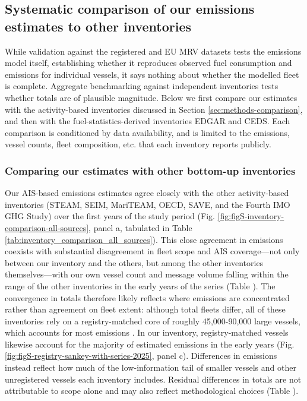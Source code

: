 \subsection{Systematic comparison of our emissions estimates to other inventories}\label{sec:inventory-comparison}

While validation against the registered and EU MRV datasets tests the emissions model itself, establishing whether it reproduces observed fuel consumption and emissions for individual vessels, it says nothing about whether the modelled fleet is complete. Aggregate benchmarking against independent inventories tests whether totals are of plausible magnitude. Below we first compare our estimates with the activity-based inventories discussed in Section \ref{sec:methods-comparison}, and then with the fuel-statistics-derived inventories EDGAR and CEDS. Each comparison is conditioned by data availability, and is limited to the emissions, vessel counts, fleet composition, etc. that each inventory reports publicly.

\subsubsection{Comparing our estimates with other bottom-up inventories}

Our AIS-based emissions estimates agree closely with the other activity-based inventories (STEAM, SEIM, MariTEAM, OECD, SAVE, and the Fourth IMO GHG Study) over the first years of the study period (Fig. \ref{fig:figS-inventory-comparison-all-sources}, panel a, tabulated in Table \ref{tab:inventory_comparison_all_sources}). This close agreement in emissions coexists with substantial disagreement in fleet scope and AIS coverage—not only between our inventory and the others, but among the other inventories themselves—with our own vessel count and message volume falling within the range of the other inventories in the early years of the series (Table ). The convergence in totals therefore likely reflects where emissions are concentrated rather than agreement on fleet extent: although total fleets differ, all of these inventories rely on a registry-matched core of roughly 45,000-90,000 large vessels, which accounts for most emissions \cite{fourth2020greenhouse, yiHighresolutionGlobalShipping2025, oecdMaritimeTransportCO2Methodology2025, documentationV2025031Documentation, johanssonGlobalAssessmentShipping2017, kramelGlobalShippingEmissions2021}. In our inventory, registry-matched vessels likewise account for the majority of estimated emissions in the early years (Fig. \ref{fig:figS-registry-sankey-with-series-2025}, panel c). Differences in emissions instead reflect how much of the low-information tail of smaller vessels and other unregistered vessels each inventory includes. Residual differences in totals are not attributable to scope alone and may also reflect methodological choices (Table ).

